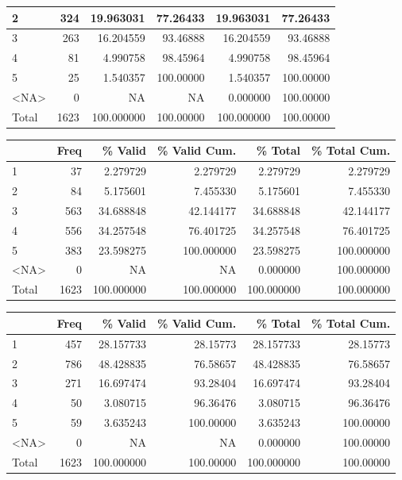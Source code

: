\documentclass[
  letterpaper,
  DIV=11,
  numbers=noendperiod]{scrartcl}
\begin{document}
\begin{table}
\begin{tabular}[t]{l|r|r|r|r|r}
\hline
2 & 324 & 19.963031 & 77.26433 & 19.963031 & 77.26433\\
\hline
3 & 263 & 16.204559 & 93.46888 & 16.204559 & 93.46888\\
\hline
4 & 81 & 4.990758 & 98.45964 & 4.990758 & 98.45964\\
\hline
5 & 25 & 1.540357 & 100.00000 & 1.540357 & 100.00000\\
\hline
<NA> & 0 & NA & NA & 0.000000 & 100.00000\\
\hline
Total & 1623 & 100.000000 & 100.00000 & 100.000000 & 100.00000\\
\hline
\end{tabular}
\centering
\begin{tabular}[t]{l|r|r|r|r|r}
\hline
  & Freq & \% Valid & \% Valid Cum. & \% Total & \% Total Cum.\\
\hline
1 & 37 & 2.279729 & 2.279729 & 2.279729 & 2.279729\\
\hline
2 & 84 & 5.175601 & 7.455330 & 5.175601 & 7.455330\\
\hline
3 & 563 & 34.688848 & 42.144177 & 34.688848 & 42.144177\\
\hline
4 & 556 & 34.257548 & 76.401725 & 34.257548 & 76.401725\\
\hline
5 & 383 & 23.598275 & 100.000000 & 23.598275 & 100.000000\\
\hline
<NA> & 0 & NA & NA & 0.000000 & 100.000000\\
\hline
Total & 1623 & 100.000000 & 100.000000 & 100.000000 & 100.000000\\
\hline
\end{tabular}
\centering
\begin{tabular}[t]{l|r|r|r|r|r}
\hline
  & Freq & \% Valid & \% Valid Cum. & \% Total & \% Total Cum.\\
\hline
1 & 457 & 28.157733 & 28.15773 & 28.157733 & 28.15773\\
\hline
2 & 786 & 48.428835 & 76.58657 & 48.428835 & 76.58657\\
\hline
3 & 271 & 16.697474 & 93.28404 & 16.697474 & 93.28404\\
\hline
4 & 50 & 3.080715 & 96.36476 & 3.080715 & 96.36476\\
\hline
5 & 59 & 3.635243 & 100.00000 & 3.635243 & 100.00000\\
\hline
<NA> & 0 & NA & NA & 0.000000 & 100.00000\\
\hline
Total & 1623 & 100.000000 & 100.00000 & 100.000000 & 100.00000\\
\hline
\end{tabular}

\end{table}
\end{document}

